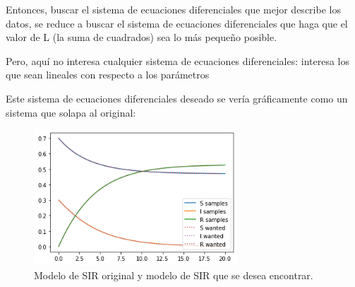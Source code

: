 Entonces, buscar el sistema de ecuaciones diferenciales que mejor describe los datos, se reduce a buscar el sistema de ecuaciones diferenciales que haga que el valor de L (la suma de cuadrados) sea lo más pequeño posible.

Pero, aquí no interesa cualquier sistema de ecuaciones diferenciales: interesa los que sean lineales con respecto a los parámetros

Este sistema de ecuaciones diferenciales deseado se vería gráficamente como un sistema que solapa al original:

\begin{figure}[!h]
    \centering

    \includegraphics[width=3in]{Graphics/sir_model_wanted.png}

    \caption{ \small{Modelo de SIR original y modelo de SIR que se desea encontrar.}}

    \label{sir_model_wanted}

\end{figure}